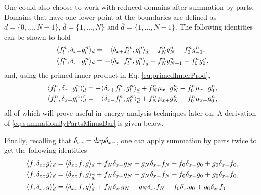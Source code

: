 One could also choose to work with reduced domains after summation by parts. Domains that have one fewer point at the boundaries are defined as $\underline{d} = \{0, \hdots, N-1\}$, 
$\overline{d} = \{1, \hdots, N\}$ and $\underline{\overline{d}} = \{1, \hdots, N-1\}$. The following identities can be shown to hold
\begin{subequations}\label{eq:summationByParts}
    \begin{align}
        \langle f_l^n, \delta_{x-} g_l^n \rangle_d  &= -\langle \delta_{x+} f_l^n, g_l^n\rangle_{\underline{d}} + f_N^ng_N^n - f_0^ng_{-1}^n,\label{eq:summationByPartsMinusBar}\\
        \langle f_l^n, \delta_{x+} g_l^n \rangle_d 
        &= -\langle \delta_{x-} f_l^n, g_l^n\rangle_{\overline{d}} + f_N^ng_{N+1}^n - f_0^ng_0^n,\label{eq:summationByPartsPlusBar}
    \end{align}
\end{subequations}
and, using the primed inner product in Eq. \eqref{eq:primedInnerProd},
\begin{subequations}
    \begin{align}
        \langle f_l^n, \delta_{x-} g_l^n \rangle_d'  = -\langle \delta_{x+} f_l^n, g_l^n \rangle_{\underline{d}}+f_N^n\mu_{x-} g_N^n-f_0^n\mu_{x-} g_0^n,\label{eq:primedIdentityMinus}\\
        \langle f_l^n, \delta_{x+} g_l^n \rangle_d'  = -\langle \delta_{x-} f_l^n, g_l^n \rangle_{\overline{d}}+f_N^n\mu_{x+} g_N^n-f_0^n\mu_{x+} g_0^n,\label{eq:primedIdentityPlus}
    \end{align}
\end{subequations}
%
all of which will prove useful in energy analysis techniques later on. A derivation of \eqref{eq:summationByPartsMinusBar} is given below. 

Finally, recalling that $\delta_{xx} = dxp\delta_{x-}$, one can apply summation by parts twice to get the following identities
\begin{subequations}
    \begin{align}
        \langle f, \delta_{xx} g\rangle_d &= \langle \delta_{xx}f, g \rangle_d+f_N\delta_{x+}g_N-g_N\delta_{x+}f_N -f_0\delta_{x-}g_0+g_0\delta_{x-}f_0,\label{eq:summationsummationByPartsTwice}\\
        \langle f, \delta_{xx} g\rangle_d &= \langle \delta_{xx}f, g \rangle_{\underline{\overline{d}}}+f_N\delta_{x+} g_N-g_N\delta_{x-} f_N -f_0\delta_{x-} g_0+g_0\delta_{x+} f_0,\label{eq:summationByPartsTwiceReduced}\\
        \langle f, \delta_{xx} g\rangle_d' &= \langle \delta_{xx} f, g\rangle_d' + f_N\delta_{x\cdot} g_N - g_N \delta_{x\cdot} f_N - f_0 \delta_{x\cdot} g_0 + g_0 \delta_{x\cdot} f_0\label{eq:summationByPartsTwicePrimed}
    \end{align}
\end{subequations}

